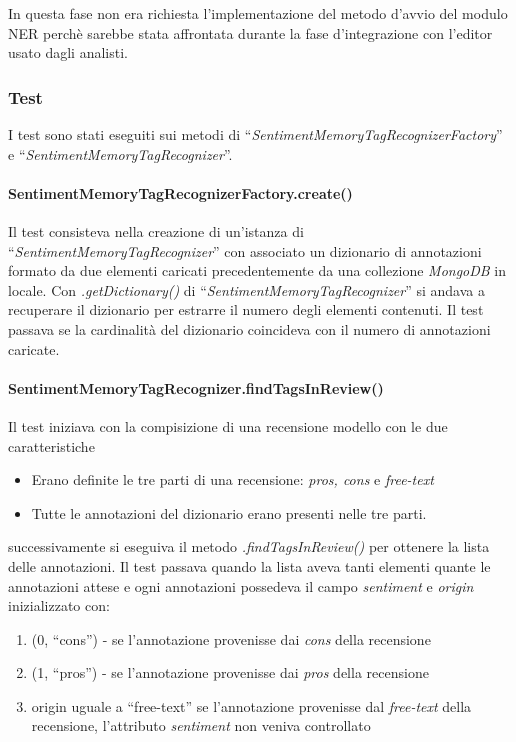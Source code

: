 In questa fase non era richiesta l'implementazione del metodo d'avvio del modulo
\gls{NER} perchè sarebbe stata affrontata durante la fase d'integrazione con
l'editor usato dagli analisti.

\subsubsection{Test}
I test sono stati eseguiti sui metodi di
``\textit{SentimentMemoryTagRecognizerFactory}'' e
``\textit{SentimentMemoryTagRecognizer}''.

\paragraph{SentimentMemoryTagRecognizerFactory.create()}
Il test consisteva nella creazione di un'istanza di
``\textit{SentimentMemoryTagRecognizer}'' con associato un dizionario di
annotazioni formato da due elementi caricati precedentemente da una collezione
\textit{MongoDB} in locale. Con \textit{.getDictionary()} di
``\textit{SentimentMemoryTagRecognizer}'' si andava a recuperare il dizionario
per estrarre il numero degli elementi contenuti. Il test passava se la
cardinalità del dizionario coincideva con il numero di annotazioni caricate.

\paragraph{SentimentMemoryTagRecognizer.findTagsInReview()}
Il test iniziava con la compisizione di una recensione modello con le due
caratteristiche
\begin{itemize}
\item Erano definite le tre parti di una recensione: \textit{pros, cons} e
\textit{free-text}
\item Tutte le annotazioni del dizionario erano presenti nelle tre parti.
\end{itemize}
successivamente si eseguiva il metodo \textit{.findTagsInReview()} per ottenere
la lista delle annotazioni. Il test passava quando la lista aveva tanti elementi
quante le annotazioni attese e ogni annotazioni possedeva il campo
\textit{sentiment} e \textit{origin} inizializzato con:
\begin{enumerate}
\item (0, ``cons'') - se l'annotazione provenisse dai \textit{cons} della
recensione
\item (1, ``pros'') - se l'annotazione provenisse dai \textit{pros} della
recensione
\item origin uguale a ``free-text'' se l'annotazione provenisse dal
\textit{free-text} della recensione, l'attributo \textit{sentiment} non veniva
controllato
\end{enumerate}

